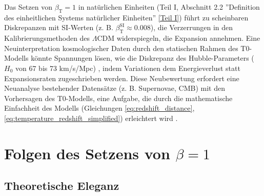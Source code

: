 \documentclass[12pt,a4paper]{article}
\newcommand{\betaT}{\beta_{\text{T}}}
\begin{document}
	Das Setzen von \(\betaT = 1\) in natürlichen Einheiten (Teil I, Abschnitt 2.2 ''Definition des einheitlichen Systems natürlicher Einheiten'' \href{https://github.com/jpascher/T0-Time-Mass-Duality/tree/main/2/pdf/Deutsch/Bridging Quantum Mechanics and Relativity through Time-Mass Duality Part I Theoretical Foundations.pdf}{[Teil I]}) führt zu scheinbaren Diskrepanzen mit SI-Werten (z. B. \(\betaT^{\text{SI}} \approx 0.008\)), die Verzerrungen in den Kalibrierungsmethoden des \(\Lambda\)CDM widerspiegeln, die Expansion annehmen. Eine Neuinterpretation kosmologischer Daten durch den statischen Rahmen des T0-Modells könnte Spannungen lösen, wie die Diskrepanz des Hubble-Parameters (\(H_0\) von 67 bis 73 km/s/Mpc) \cite{DiValentino2021}, indem Variationen dem Energieverlust statt Expansionsraten zugeschrieben werden. Diese Neubewertung erfordert eine Neuanalyse bestehender Datensätze (z. B. Supernovae, CMB) mit den Vorhersagen des T0-Modells, eine Aufgabe, die durch die mathematische Einfachheit des Modells (Gleichungen \ref{eq:redshift_distance}, \ref{eq:temperature_redshift_simplified}) erleichtert wird \cite{pascher_alphabeta_2025}.
	
	\section{Folgen des Setzens von \(\beta = 1\)}
	\label{sec:consequences_beta}
	
	\subsection{Theoretische Eleganz}
	\label{subsec:theoretical_elegance}
	
\end{document}
